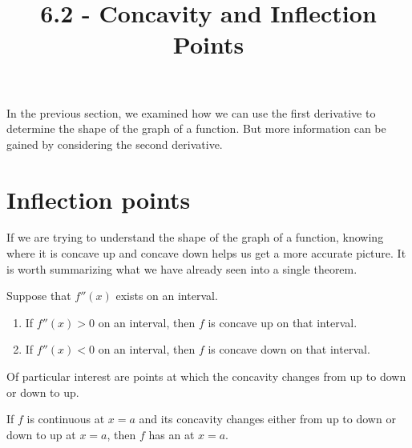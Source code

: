 \documentclass{ximera}
\title{6.2 - Concavity and Inflection Points}
\begin{document}
\maketitle
In the previous section, we examined how we can use the first derivative to determine the shape of the graph of a function. But more information can be gained by considering the second derivative. 

\section{Inflection points}


If we are trying to understand the shape of the graph of a function,
knowing where it is concave up and concave down helps us  get a more
accurate picture. It is worth summarizing what we have already seen into
 a single theorem.

\begin{theorem}
Suppose that $f''(x)$ exists on an interval.
\begin{enumerate}
\item If $f''(x)>0$ on an interval, then $f$ is concave up on that interval.
\item If $f''(x)<0$ on an interval, then $f$ is concave down on that interval.
\end{enumerate}
\end{theorem}


Of particular interest are points at which the concavity changes from
up to down or down to up. 

\begin{definition}
If $f$ is continuous at $x=a$ and its concavity changes either from up to down
or down to up at $x=a$, then $f$ has an  at
$x=a$.
\end{definition}
\end{document}
